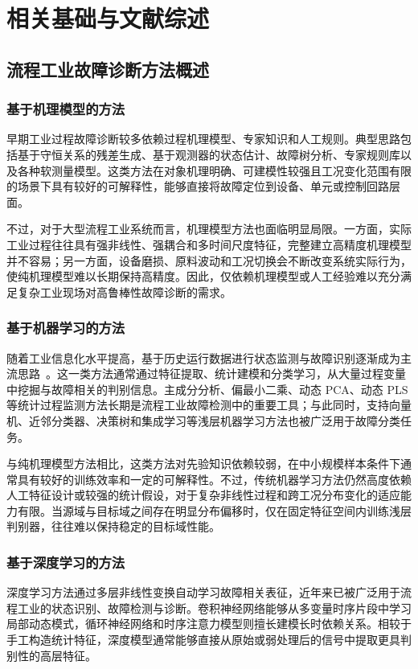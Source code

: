 \chapter{相关基础与文献综述}

\section{流程工业故障诊断方法概述}
\subsection{基于机理模型的方法}
早期工业过程故障诊断较多依赖过程机理模型、专家知识和人工规则。典型思路包括基于守恒关系的残差生成、基于观测器的状态估计、故障树分析、专家规则库以及各种软测量模型。这类方法在对象机理明确、可建模性较强且工况变化范围有限的场景下具有较好的可解释性，能够直接将故障定位到设备、单元或控制回路层面。

不过，对于大型流程工业系统而言，机理模型方法也面临明显局限。一方面，实际工业过程往往具有强非线性、强耦合和多时间尺度特征，完整建立高精度机理模型并不容易；另一方面，设备磨损、原料波动和工况切换会不断改变系统实际行为，使纯机理模型难以长期保持高精度。因此，仅依赖机理模型或人工经验难以充分满足复杂工业现场对高鲁棒性故障诊断的需求。

\subsection{基于机器学习的方法}
随着工业信息化水平提高，基于历史运行数据进行状态监测与故障识别逐渐成为主流思路~\cite{qin2012survey}。这一类方法通常通过特征提取、统计建模和分类学习，从大量过程变量中挖掘与故障相关的判别信息。主成分分析、偏最小二乘、动态 PCA、动态 PLS 等统计过程监测方法长期是流程工业故障检测中的重要工具；与此同时，支持向量机、近邻分类器、决策树和集成学习等浅层机器学习方法也被广泛用于故障分类任务。

与纯机理模型方法相比，这类方法对先验知识依赖较弱，在中小规模样本条件下通常具有较好的训练效率和一定的可解释性。不过，传统机器学习方法仍然高度依赖人工特征设计或较强的统计假设，对于复杂非线性过程和跨工况分布变化的适应能力有限。当源域与目标域之间存在明显分布偏移时，仅在固定特征空间内训练浅层判别器，往往难以保持稳定的目标域性能。

\subsection{基于深度学习的方法}
深度学习方法通过多层非线性变换自动学习故障相关表征，近年来已被广泛用于流程工业的状态识别、故障检测与诊断。卷积神经网络能够从多变量时序片段中学习局部动态模式，循环神经网络和时序注意力模型则擅长建模长时依赖关系。相较于手工构造统计特征，深度模型通常能够直接从原始或弱处理后的信号中提取更具判别性的高层特征。

